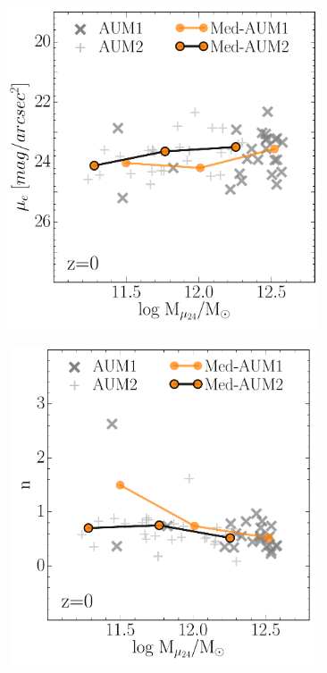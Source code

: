 \begin{figure}[H]
 \centering
 \includegraphics[height=9.5cm, width=10cm]{../al_final/plots/parametros_de_escala/mevsm_medians.pdf}
\end{figure}

\begin{figure}[H]
 \centering
 \includegraphics[height=9.5cm, width=10cm]{../al_final/plots/parametros_de_escala/nvsm_medians.pdf}
\end{figure}

